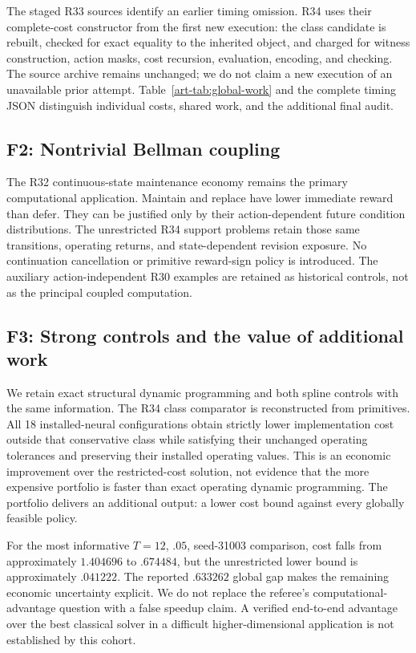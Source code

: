 The staged R33 sources identify an earlier timing omission. R34 uses their complete-cost constructor from the first new execution: the class candidate is rebuilt, checked for exact equality to the inherited object, and charged for witness construction, action masks, cost recursion, evaluation, encoding, and checking. The source archive remains unchanged; we do not claim a new execution of an unavailable prior attempt. Table~\ref{art-tab:global-work} and the complete timing JSON distinguish individual costs, shared work, and the additional final audit.

\subsection{F2: Nontrivial Bellman coupling}
The R32 continuous-state maintenance economy remains the primary computational application. Maintain and replace have lower immediate reward than defer. They can be justified only by their action-dependent future condition distributions. The unrestricted R34 support problems retain those same transitions, operating returns, and state-dependent revision exposure. No continuation cancellation or primitive reward-sign policy is introduced. The auxiliary action-independent R30 examples are retained as historical controls, not as the principal coupled computation.

\subsection{F3: Strong controls and the value of additional work}
We retain exact structural dynamic programming and both spline controls with the same information. The R34 class comparator is reconstructed from primitives. All 18 installed-neural configurations obtain strictly lower implementation cost outside that conservative class while satisfying their unchanged operating tolerances and preserving their installed operating values. This is an economic improvement over the restricted-cost solution, not evidence that the more expensive portfolio is faster than exact operating dynamic programming. The portfolio delivers an additional output: a lower cost bound against every globally feasible policy.

For the most informative $T=12$, $.05$, seed-31003 comparison, cost falls from approximately $1.404696$ to $.674484$, but the unrestricted lower bound is approximately $.041222$. The reported $.633262$ global gap makes the remaining economic uncertainty explicit. We do not replace the referee's computational-advantage question with a false speedup claim. A verified end-to-end advantage over the best classical solver in a difficult higher-dimensional application is not established by this cohort.

